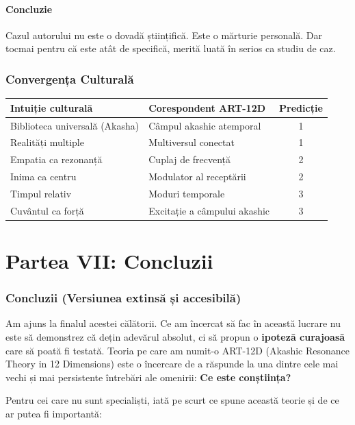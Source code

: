 \documentclass[11pt,a4paper]{article}
\begin{document}
\subsection{Concluzie}
Cazul autorului nu este o dovadă științifică. Este o mărturie personală. Dar tocmai pentru că este atât de specifică, merită luată în serios ca studiu de caz.

\section{Convergența Culturală}
\begin{table}[H]
\centering
\begin{tabular}{@{}llc@{}}
\toprule
\textbf{Intuiție culturală} & \textbf{Corespondent ART-12D} & \textbf{Predicție} \\ \midrule
Biblioteca universală (Akasha) & Câmpul akashic atemporal & 1 \\
Realități multiple & Multiversul conectat & 1 \\
Empatia ca rezonanță & Cuplaj de frecvență & 2 \\
Inima ca centru & Modulator al receptării & 2 \\
Timpul relativ & Moduri temporale & 3 \\
Cuvântul ca forță & Excitație a câmpului akashic & 3 \\ \bottomrule
\end{tabular}
\end{table}

\newpage
\part*{Partea VII: Concluzii}

\section{Concluzii (Versiunea extinsă și accesibilă)}
Am ajuns la finalul acestei călătorii. Ce am încercat să fac în această lucrare nu este să demonstrez că dețin adevărul absolut, ci să propun o \textbf{ipoteză curajoasă} care să poată fi testată. Teoria pe care am numit-o ART-12D (Akashic Resonance Theory in 12 Dimensions) este o încercare de a răspunde la una dintre cele mai vechi și mai persistente întrebări ale omenirii: \textbf{Ce este conștiința?}

Pentru cei care nu sunt specialiști, iată pe scurt ce spune această teorie și de ce ar putea fi importantă:
\end{document}
